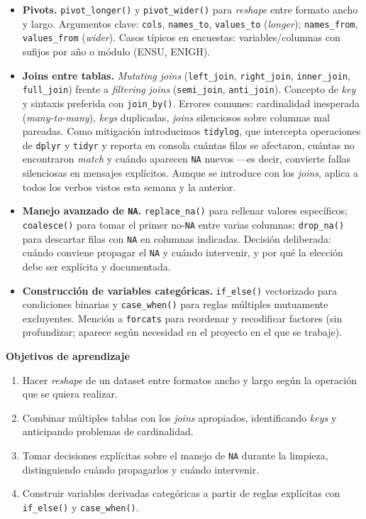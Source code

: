\documentclass[11pt,letterpaper]{article}
\newcommand{\blue}[1]{{\color{cerulean}#1}}
\begin{document}
\begin{itemize}[leftmargin=*, itemsep=2pt]
    \item \textbf{Pivots.} \texttt{pivot\_longer()} y \texttt{pivot\_wider()} para \textit{reshape} entre formato ancho y largo. Argumentos clave: \texttt{cols}, \texttt{names\_to}, \texttt{values\_to} (\textit{longer}); \texttt{names\_from}, \texttt{values\_from} (\textit{wider}). Casos típicos en encuestas: variables/columnas con sufijos por año o módulo (ENSU, ENIGH). 
    \item \textbf{Joins entre tablas.} \textit{Mutating joins} (\texttt{left\_join}, \texttt{right\_join}, \texttt{inner\_join}, \texttt{full\_join}) frente a \textit{filtering joins} (\texttt{semi\_join}, \texttt{anti\_join}). Concepto de \textit{key} y sintaxis preferida con \texttt{join\_by()}. Errores comunes: cardinalidad inesperada (\textit{many-to-many}), \textit{keys} duplicadas, \textit{joins} silenciosos sobre columnas mal pareadas. Como mitigación introducimos \blue{\texttt{tidylog}}, que intercepta operaciones de \texttt{dplyr} y \texttt{tidyr} y reporta en consola cuántas filas se afectaron, cuántas no encontraron \textit{match} y cuándo aparecen \texttt{NA} nuevos ---es decir, convierte fallas silenciosas en mensajes explícitos. Aunque se introduce con los \textit{joins}, aplica a todos los verbos vistos esta semana y la anterior.
    \item \textbf{Manejo avanzado de \texttt{NA}.} \texttt{replace\_na()} para rellenar valores específicos; \texttt{coalesce()} para tomar el primer no-\texttt{NA} entre varias columnas; \texttt{drop\_na()} para descartar filas con \texttt{NA} en columnas indicadas. \blue{Decisión deliberada}: cuándo conviene propagar el \texttt{NA} y cuándo intervenir, y por qué la elección debe ser explícita y documentada.
    \item \textbf{Construcción de variables categóricas.} \texttt{if\_else()} vectorizado para condiciones binarias y \texttt{case\_when()} para reglas múltiples mutuamente excluyentes. Mención a \texttt{forcats} para reordenar y recodificar factores (sin profundizar; aparece según necesidad en el proyecto en el que se trabaje).
\end{itemize}

\medskip
\noindent\textbf{Objetivos de aprendizaje}
\begin{enumerate}[leftmargin=*, itemsep=1pt]
    \item Hacer \textit{reshape} de un dataset entre formatos ancho y largo según la operación que se quiera realizar.
    \item Combinar múltiples tablas con los \textit{joins} apropiados, identificando \textit{keys} y anticipando problemas de cardinalidad.
    \item Tomar decisiones explícitas sobre el manejo de \texttt{NA} durante la limpieza, distinguiendo cuándo propagarlos y cuándo intervenir.
    \item Construir variables derivadas categóricas a partir de reglas explícitas con \texttt{if\_else()} y \texttt{case\_when()}.
\end{enumerate}
\end{document}
